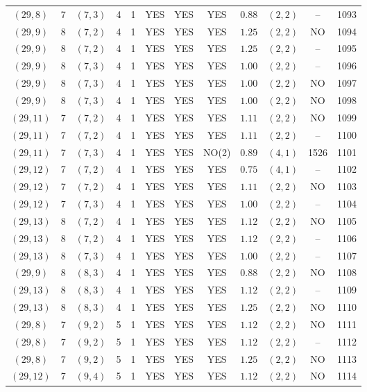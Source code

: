 \begin{longtable}{|c|c|c|c|c|c|c|c|c|c|c|c|}
$(29,8)$ & 7 & $(7,3)$ & 4 & 1 & YES & YES & YES & $0.88$ & $(2,2)$ & -- & 1093\\
$(29,9)$ & 8 & $(7,2)$ & 4 & 1 & YES & YES & YES & $1.25$ & $(2,2)$ & NO & 1094\\
$(29,9)$ & 8 & $(7,2)$ & 4 & 1 & YES & YES & YES & $1.25$ & $(2,2)$ & -- & 1095\\
$(29,9)$ & 8 & $(7,3)$ & 4 & 1 & YES & YES & YES & $1.00$ & $(2,2)$ & -- & 1096\\
$(29,9)$ & 8 & $(7,3)$ & 4 & 1 & YES & YES & YES & $1.00$ & $(2,2)$ & NO & 1097\\
$(29,9)$ & 8 & $(7,3)$ & 4 & 1 & YES & YES & YES & $1.00$ & $(2,2)$ & NO & 1098\\
$(29,11)$ & 7 & $(7,2)$ & 4 & 1 & YES & YES & YES & $1.11$ & $(2,2)$ & NO & 1099\\
$(29,11)$ & 7 & $(7,2)$ & 4 & 1 & YES & YES & YES & $1.11$ & $(2,2)$ & -- & 1100\\
$(29,11)$ & 7 & $(7,3)$ & 4 & 1 & YES & YES & NO(2) & $0.89$ & $(4,1)$ & 1526 & 1101\\
$(29,12)$ & 7 & $(7,2)$ & 4 & 1 & YES & YES & YES & $0.75$ & $(4,1)$ & -- & 1102\\
$(29,12)$ & 7 & $(7,2)$ & 4 & 1 & YES & YES & YES & $1.11$ & $(2,2)$ & NO & 1103\\
$(29,12)$ & 7 & $(7,3)$ & 4 & 1 & YES & YES & YES & $1.00$ & $(2,2)$ & -- & 1104\\
$(29,13)$ & 8 & $(7,2)$ & 4 & 1 & YES & YES & YES & $1.12$ & $(2,2)$ & NO & 1105\\
$(29,13)$ & 8 & $(7,2)$ & 4 & 1 & YES & YES & YES & $1.12$ & $(2,2)$ & -- & 1106\\
$(29,13)$ & 8 & $(7,3)$ & 4 & 1 & YES & YES & YES & $1.00$ & $(2,2)$ & -- & 1107\\
$(29,9)$ & 8 & $(8,3)$ & 4 & 1 & YES & YES & YES & $0.88$ & $(2,2)$ & NO & 1108\\
$(29,13)$ & 8 & $(8,3)$ & 4 & 1 & YES & YES & YES & $1.12$ & $(2,2)$ & -- & 1109\\
$(29,13)$ & 8 & $(8,3)$ & 4 & 1 & YES & YES & YES & $1.25$ & $(2,2)$ & NO & 1110\\
$(29,8)$ & 7 & $(9,2)$ & 5 & 1 & YES & YES & YES & $1.12$ & $(2,2)$ & NO & 1111\\
$(29,8)$ & 7 & $(9,2)$ & 5 & 1 & YES & YES & YES & $1.12$ & $(2,2)$ & -- & 1112\\
$(29,8)$ & 7 & $(9,2)$ & 5 & 1 & YES & YES & YES & $1.25$ & $(2,2)$ & NO & 1113\\
$(29,12)$ & 7 & $(9,4)$ & 5 & 1 & YES & YES & YES & $1.12$ & $(2,2)$ & NO & 1114\\

\end{longtable}
